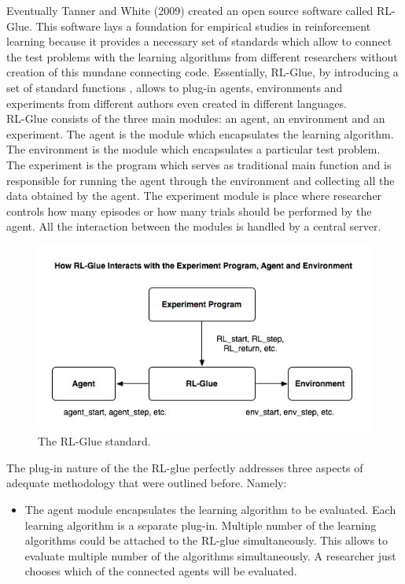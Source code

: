 {{Eventually Tanner and White (2009)\nocite{tanner2009rl} created an open source software called RL-Glue. This software lays a foundation for empirical studies in reinforcement learning because it provides a necessary set of standards which allow to connect the test problems with the learning algorithms from different researchers without creation of this mundane connecting code. Essentially, RL-Glue, by introducing a set of standard functions , allows to plug-in agents, environments and experiments from different authors even created in different languages. \\

RL-Glue consists of the three main modules: an agent, an environment and an experiment. The agent is the module which encapsulates the learning algorithm. The environment is the module which encapsulates a particular test problem. The experiment is the program which serves as traditional main function and is responsible for running the agent through the environment and collecting all the data obtained by the agent. The experiment module is place where researcher controls how many episodes or how many trials should be performed by the agent. All the interaction between the modules is handled by a central server. \\
\begin{figure}[ht]
\vskip 0.2in
\centering
\includegraphics[scale=0.9]{glue.png}
\caption{The RL-Glue standard.}
\vskip -0.2in
\label{rlglue}
\end{figure}
The plug-in nature of the the RL-glue perfectly addresses three aspects of adequate methodology that were outlined before. Namely:

\begin{itemize}

\item The agent module encapsulates the learning algorithm to be evaluated. Each learning algorithm is a separate plug-in. Multiple number of the learning algorithms could be attached to the RL-glue simultaneously. This allows to evaluate multiple number of the algorithms simultaneously. A researcher just chooses which of the connected agents will be evaluated.


\end{itemize}}}
